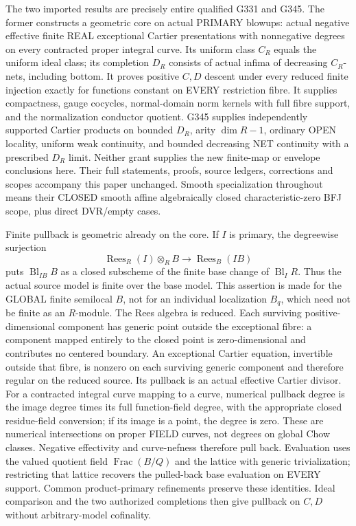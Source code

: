 \documentclass[11pt]{article}
\begin{document}
The two imported results are precisely entire qualified G331 and G345. The former constructs a geometric core on actual PRIMARY blowups: actual negative effective finite REAL exceptional Cartier presentations with nonnegative degrees on every contracted proper integral curve. Its uniform class $C_R$ equals the uniform ideal class; its completion $D_R$ consists of actual infima of decreasing $C_R$-nets, including bottom. It proves positive $C,D$ descent under every reduced finite injection exactly for functions constant on EVERY restriction fibre. It supplies compactness, gauge cocycles, normal-domain norm kernels with full fibre support, and the normalization conductor quotient. G345 supplies independently supported Cartier products on bounded $D_R$, arity $\dim R-1$, ordinary OPEN locality, uniform weak continuity, and bounded decreasing NET continuity with a prescribed $D_R$ limit. Neither grant supplies the new finite-map or envelope conclusions here. Their full statements, proofs, source ledgers, corrections and scopes accompany this paper unchanged. Smooth specialization throughout means their CLOSED smooth affine algebraically closed characteristic-zero BFJ scope, plus direct DVR/empty cases.

Finite pullback is geometric already on the core. If $I$ is primary, the degreewise surjection
\[
\operatorname{Rees}_R(I)\otimes_R B\longrightarrow \operatorname{Rees}_B(IB)
\]
puts $\operatorname{Bl}_{IB}B$ as a closed subscheme of the finite base change of $\operatorname{Bl}_I R$. Thus the actual source model is finite over the base model. This assertion is made for the GLOBAL finite semilocal $B$, not for an individual localization $B_q$, which need not be finite as an $R$-module. The Rees algebra is reduced. Each surviving positive-dimensional component has generic point outside the exceptional fibre: a component mapped entirely to the closed point is zero-dimensional and contributes no centered boundary. An exceptional Cartier equation, invertible outside that fibre, is nonzero on each surviving generic component and therefore regular on the reduced source. Its pullback is an actual effective Cartier divisor. For a contracted integral curve mapping to a curve, numerical pullback degree is the image degree times its full function-field degree, with the appropriate closed residue-field conversion; if its image is a point, the degree is zero. These are numerical intersections on proper FIELD curves, not degrees on global Chow classes. Negative effectivity and curve-nefness therefore pull back. Evaluation uses the valued quotient field $\operatorname{Frac}(B/Q)$ and the lattice with generic trivialization; restricting that lattice recovers the pulled-back base evaluation on EVERY support. Common product-primary refinements preserve these identities. Ideal comparison and the two authorized completions then give pullback on $C,D$ without arbitrary-model cofinality.
\end{document}
